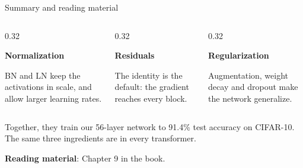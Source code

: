 \documentclass[11pt,aspectratio=169]{beamer}
\begin{document}
\begin{frame}{Summary and reading material}
    \setlength{\parskip}{8pt}

    \vspace{1em}

    \begin{columns}[T,onlytextwidth]
        \begin{column}{0.32\textwidth}
            \begin{tcolorbox}[nndsblue,courseheight={summary}{}]
                \textbf{Normalization}

                BN and LN keep the activations in scale, and allow larger
                learning rates.
            \end{tcolorbox}
        \end{column}
        \begin{column}{0.32\textwidth}
            \begin{tcolorbox}[nndsred,courseheight={summary}{}]
                \textbf{Residuals}

                The identity is the default: the gradient reaches every block.
            \end{tcolorbox}
        \end{column}
        \begin{column}{0.32\textwidth}
            \begin{tcolorbox}[nndsgreen,courseheight={summary}{}]
                \textbf{Regularization}

                Augmentation, weight decay and dropout make the network
                generalize.
            \end{tcolorbox}
        \end{column}
    \end{columns}

    \medskip
    Together, they train our 56-layer network to 91.4\% test accuracy on
    CIFAR-10. The same three ingredients are in every
    transformer.

    \textbf{Reading material}: Chapter 9 in the book.

\end{frame}
\end{document}
